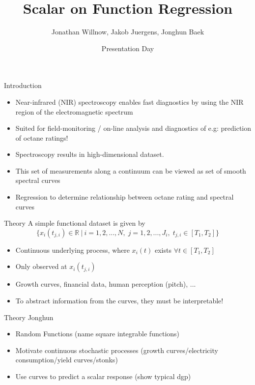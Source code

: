 \documentclass{beamer}
\title{Scalar on Function Regression}
\author{Jonathan Willnow, Jakob Juergens, Jonghun Baek}
\date{{\color{red}}Presentation Day}
\begin{document}
	
	\begin{frame}
		\titlepage 
	\end{frame}
	
	\logo{}
	
	
	\begin{frame}{Introduction}
	
		\begin{itemize}
			\item Near-infrared (NIR) spectroscopy enables fast diagnostics by using the NIR region of the electromagnetic spectrum
			\item Suited for field-monitoring / on-line analysis and diagnostics of e.g: prediction of octane ratings!
			\item Spectroscopy results in high-dimensional dataset.	
			\item This set of measurements along a continuum can be viewed as set of smooth spectral curves
			\item Regression to determine relationship between octane rating and spectral curves
			\end{itemize}
	\end{frame}
	
	\begin{frame}{Theory}
		A simple functional dataset is given by 
		$$\{x_{i}(t_{j,i}) \in \mathbb{R} \: \vert \: i = 1,2,...,N, \; j = 1,2,..., J_i, \; t_{j,i} \in [T_1, T_2] \}$$
		
		\begin{itemize}
			\item Continuous underlying process, where $x_i(t)$ exists $\forall t \in [T_1, T_2]$
			\item Only observed at $x_{i}(t_{j,i})$
			\item Growth curves, financial data, human perception (pitch), ...
			\item To abstract information from the curves, they must be interpretable!
			\end{itemize}
	\end{frame}

	\begin{frame}{Theory}
		Jonghun
		\begin{itemize}
			\item Random Functions (name square integrable functions)
			\item Motivate continuous stochastic processes (growth curves/electricity consumption/yield curves/stonks)
			\item Use curves to predict a scalar response (show typical dgp)
		\end{itemize}
	\end{frame}
\end{document}
